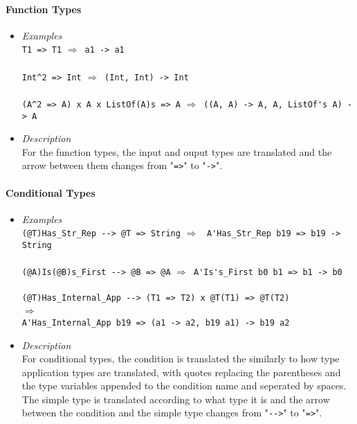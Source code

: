 \documentclass{article}
\def\lra{$\Longrightarrow$\ }
\begin{document}
\paragraph{Function Types}

\begin{itemize}
\item
\textit{Examples}\\

\verb|T1 => T1| \lra \verb|a1 -> a1|\\\\
\verb|Int^2 => Int| \lra \verb|(Int, Int) -> Int|\\\\
\verb|(A^2 => A) x A x ListOf(A)s => A|
\lra \verb|((A, A) -> A, A, ListOf's A) -> A|\\

\item
\textit{Description}\\

For the function types, the input and ouput types are translated and
the arrow between them changes from "\verb|=>|" to "\verb|->|".

\end{itemize}

\newpage
\paragraph{Conditional Types}

\begin{itemize}
\item
\textit{Examples}\\

\verb|(@T)Has_Str_Rep --> @T => String|
\lra
\verb|A'Has_Str_Rep b19 => b19 -> String|\\\\
\verb|(@A)Is(@B)s_First --> @B => @A|
\lra \verb|A'Is's_First b0 b1 => b1 -> b0|\\\\
\verb|(@T)Has_Internal_App --> (T1 => T2) x @T(T1) => @T(T2)|
\\
\lra
\\
\verb|A'Has_Internal_App b19 => (a1 -> a2, b19 a1) -> b19 a2|\\

\item
\textit{Description}\\

For conditional types, the condition is translated the similarly to how type
application types are translated, with quotes replacing the parentheses and
the type variables appended to the condition name and seperated by spaces.
The simple type is translated according to what type it is and
the arrow between the condition and the simple type changes from "\verb|-->|"
to "\verb|=>|".

\end{itemize}
\end{document}
